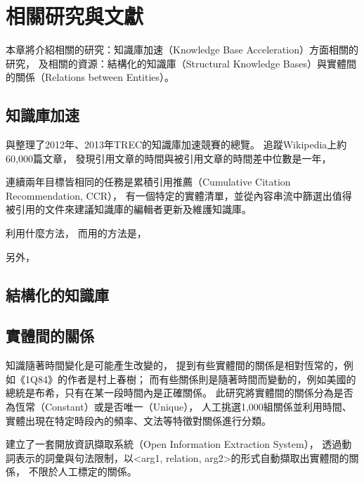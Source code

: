%
%
%
\chapter{相關研究與文獻}
\label{c:related}

本章將介紹相關的研究：知識庫加速（Knowledge Base Acceleration）方面相關的研究，
及相關的資源：結構化的知識庫（Structural Knowledge Bases）與實體間的關係（Relations between Entities）。

%
%
\section{知識庫加速}

\cite{kba2012}與\cite{kba2013}整理了2012年、2013年TREC的知識庫加速競賽的總覽。
\cite{kba2012}追蹤Wikipedia上約60,000篇文章，
發現引用文章的時間與被引用文章的時間差中位數是一年，

連續兩年目標皆相同的任務是累積引用推薦（Cumulative Citation Recommendation, CCR），
有一個特定的實體清單，並從內容串流中篩選出值得被引用的文件來建議知識庫的編輯者更新及維護知識庫。


\cite{kba-hltoce}利用什麼方法，
而\cite{kba-msra}用的方法是，

另外，\cite{kba-entity-detection}

%
%
\section{結構化的知識庫}

\cite{freebase}
\cite{dbpedia}
\cite{yago}

%
%
\section{實體間的關係}

知識隨著時間變化是可能產生改變的，
\cite{relationsByTime} 提到有些實體間的關係是相對恆常的，例如《1Q84》的作者是村上春樹；
而有些關係則是隨著時間而變動的，例如美國的總統是布希，只有在某一段時間內是正確關係。
此研究將實體間的關係分為是否為恆常（Constant）或是否唯一（Unique），
人工挑選1,000組關係並利用時間、實體出現在特定時段內的頻率、文法等特徵對關係進行分類。

\cite{reverb} 建立了一套開放資訊擷取系統（Open Information Extraction System），
透過動詞表示的詞彙與句法限制，以<arg1, relation, arg2>的形式自動擷取出實體間的關係，
不限於人工標定的關係。


